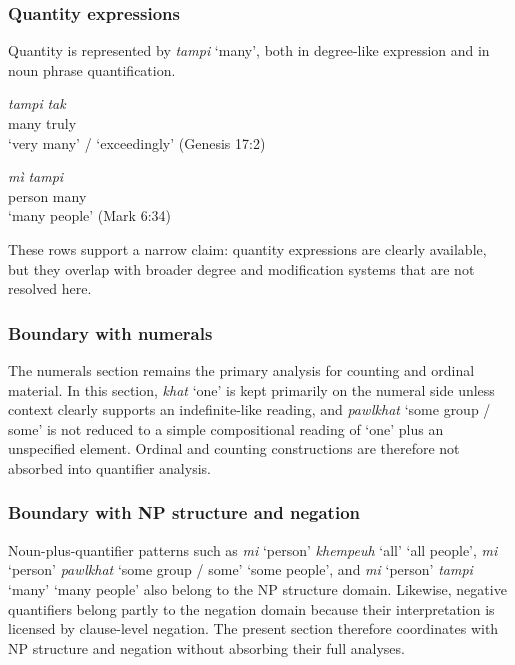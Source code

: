 \documentclass[
  11pt,
  a4paper,
]{article}
\newcommand{\tdim}[1]{\textit{#1}}
\newcommand{\tdimword}[1]{\textit{#1}}
\newcommand{\glossquote}[1]{`#1'}
\begin{document}
\subsubsection{Quantity expressions}\label{quantity-expressions}

Quantity is represented by \tdim{tampi} \glossquote{many}, both in
degree-like expression and in noun phrase quantification.

\begin{exe}
\ex \label{ex:quant-tampi-tak}
\gll \tdimword{tampi} \tdimword{tak} \\
     many truly \\
\glt \glossquote{very many} / \glossquote{exceedingly} (Genesis 17:2)
\end{exe}

\begin{exe}
\ex \label{ex:quant-mi-tampi}
\gll \tdimword{mì} \tdimword{tampi} \\
     person many \\
\glt \glossquote{many people} (Mark 6:34)
\end{exe}

These rows support a narrow claim: quantity expressions are clearly
available, but they overlap with broader degree and modification systems
that are not resolved here.

\subsubsection{Boundary with numerals}\label{boundary-with-numerals}

The numerals section remains the primary analysis for counting and
ordinal material. In this section, \tdim{khat} \glossquote{one} is kept
primarily on the numeral side unless context clearly supports an
indefinite-like reading, and \tdim{pawlkhat}
\glossquote{some group / some} is not reduced to a simple compositional
reading of \glossquote{one} plus an unspecified element. Ordinal and
counting constructions are therefore not absorbed into quantifier
analysis.

\subsubsection{Boundary with NP structure and
negation}\label{boundary-with-np-structure-and-negation}

Noun-plus-quantifier patterns such as \tdim{mi} \glossquote{person}
\tdim{khempeuh} \glossquote{all} \glossquote{all people}, \tdim{mi}
\glossquote{person} \tdim{pawlkhat} \glossquote{some group / some}
\glossquote{some people}, and \tdim{mi} \glossquote{person} \tdim{tampi}
\glossquote{many} \glossquote{many people} also belong to the NP
structure domain. Likewise, negative quantifiers belong partly to the
negation domain because their interpretation is licensed by clause-level
negation. The present section therefore coordinates with NP structure
and negation without absorbing their full analyses.
\end{document}
